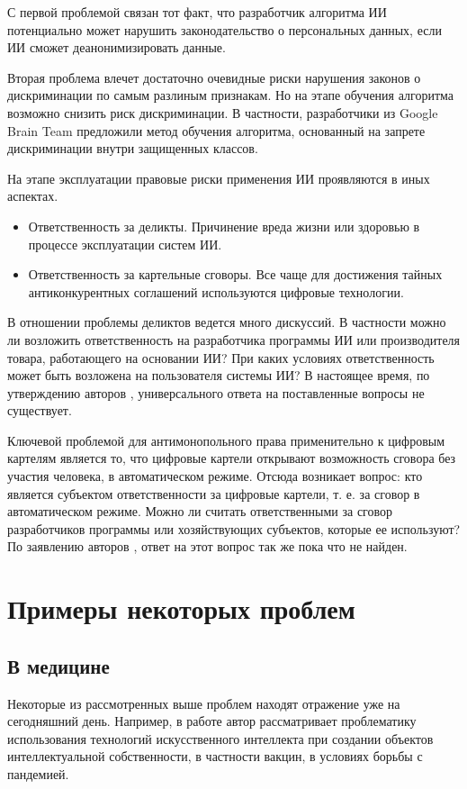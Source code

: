 С первой проблемой связан тот факт, что разработчик алгоритма ИИ потенциально может нарушить законодательство
о персональных данных, если ИИ сможет деанонимизировать данные.

Вторая проблема влечет достаточно очевидные риски нарушения законов о дискриминации по самым разлиным признакам.
Но на этапе обучения алгоритма возможно снизить риск
дискриминации. В частности, разработчики из Google Brain Team предложили метод обучения алгоритма,
основанный на запрете дискриминации внутри защищенных классов.

На этапе эксплуатации правовые риски применения ИИ проявляются в иных аспектах.

\begin{itemize}
\item Ответственность за деликты. Причинение вреда жизни или здоровью в процессе эксплуатации систем ИИ.
\item Ответственность за картельные сговоры. Все чаще для достижения тайных антиконкурентных соглашений
используются цифровые технологии.
\end{itemize}

В отношении проблемы деликтов ведется много дискуссий. В частности можно ли возложить ответственность на
разработчика программы ИИ или производителя товара, работающего на основании ИИ? При каких условиях
ответственность может быть возложена на пользователя системы ИИ? В настоящее время, по
утверждению авторов \cite{self}, универсального ответа на поставленные вопросы не существует.

Ключевой проблемой для антимонопольного права применительно к цифровым картелям является то,
что цифровые картели открывают возможность сговора без участия человека, в автоматическом режиме.
Отсюда возникает вопрос: кто является субъектом ответственности за цифровые картели, т. е. за сговор
в автоматическом режиме. Можно ли считать ответственными за сговор разработчиков программы или
хозяйствующих субъектов, которые ее используют? По заявлению авторов \cite{self}, ответ на этот вопрос
так же пока что не найден.
\newpage

\section{Примеры некоторых проблем}
\subsection{В медицине}
Некоторые из рассмотренных выше проблем находят отражение уже на сегодняшний день. Например,
в работе \cite{vac} автор рассматривает проблематику использования технологий искусственного
интеллекта при создании объектов интеллектуальной собственности, в частности вакцин, в условиях
борьбы с пандемией.

